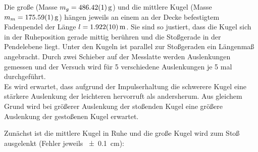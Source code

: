 Die große (Masse $m_g=\SI{486.42\pm0.01}{g}$) und die mittlere Kugel (Masse $m_m=\SI{175.59\pm0.01}{g}$) hängen jeweils an einem an der Decke befestigtem Fadenpendel der Länge $l=\SI{1.922\pm0.01}{m}$. Sie sind so justiert, dass die Kugel sich in der Ruheposition gerade mittig berühren und die Stoßgerade in der Pendelebene liegt. Unter den Kugeln ist parallel zur Stoßgeraden ein Längenmaß angebracht. Durch zwei Schieber auf der Messlatte werden Auslenkungen gemessen und der Versuch wird für 5 verschiedene Auslenkungen je 5 mal durchgeführt.\\

Es wird erwartet, dass aufgrund der Impulserhaltung die schwerere Kugel eine stärkere Auslenkung der leichteren hervorruft als andersherum. Aus gleichem Grund wird bei größerer Auslenkung der stoßenden Kugel eine größere Auslenkung der gestoßenen Kugel erwartet.

Zunächst ist die mittlere Kugel in Ruhe und die große Kugel wird zum Stoß ausgelenkt (Fehler jeweils \SI{\pm0.1}{cm}):

